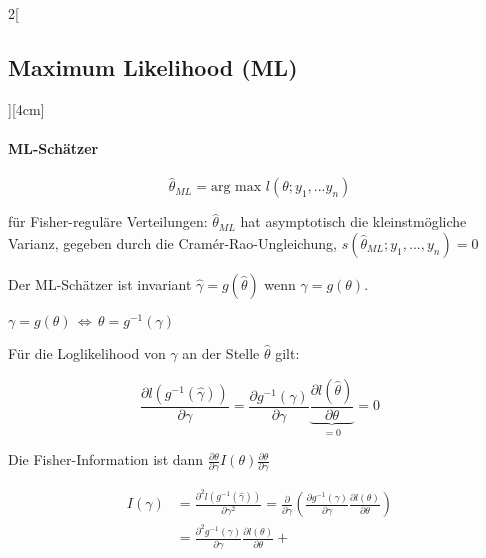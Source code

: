 \documentclass[8pt]{extarticle}
\begin{document}
\begin{multicols}{2}[\subsection{Maximum Likelihood (ML)}][4cm]
  \paragraph{ML-Schätzer}
   $$\hat{\theta}_{ML} = \text{arg max } l(\theta; y_1,...y_n)$$
   
\noindent für Fisher-reguläre Verteilungen: $\hat{\theta}_{ML}$ hat asymptotisch die kleinstmögliche Varianz, gegeben durch die Cramér-Rao-Ungleichung, 
   $s\left(\hat{\theta}_{ML};y_1,...,y_n\right) = 0$
   
\noindent Der ML-Schätzer ist invariant $\hat{\gamma} = g(\hat{\theta})$ wenn $\gamma = g(\theta)$. 
   
\begin{Beweis}
$\gamma = g(\theta)\, \Leftrightarrow \,\theta = g^{-1}(\gamma)$

\noindent Für die Loglikelihood von $\gamma$ an der Stelle $\hat{\theta}$ gilt:

$$\frac{\partial l(g^{-1}(\hat{\gamma}))}{\partial \gamma} = \frac{\partial g^{-1}(\gamma)}{\partial\gamma} \underbrace{\frac{\partial l(\hat{\theta})}{\partial \theta}}_{=0} = 0$$
\end{Beweis}   

\noindent Die Fisher-Information ist dann $\frac{\partial\theta}{\partial\gamma} I(\theta) \frac{\partial\theta}{\partial\gamma}$

\begin{Beweis}
\begin{align*}
I(\gamma) &= 
\frac{\partial^2 l(g^{-1}(\hat{\gamma}))}{\partial \gamma^2} = 
\frac{\partial}{\partial\gamma} \left( \frac{\partial g^{-1}(\gamma)}{\partial\gamma} \frac{\partial l(\theta)}{\partial\theta} \right) \\
&= \frac{\partial^2 g^{-1}(\gamma)}{\partial\gamma}\frac{\partial l(\theta)}{\partial\theta} + 
\end{align*}
\end{Beweis}

  

\end{multicols}
\end{document}
